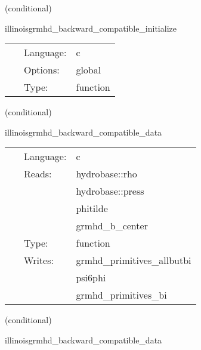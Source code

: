 \documentclass{article}
\begin{document}
\vspace{5mm}

   (conditional) 

\hspace{5mm} illinoisgrmhd\_backward\_compatible\_initialize 

\hspace{5mm}{\it set up the grhayl structs and read the table for tabulated eos. } 


\hspace{5mm}

 \begin{tabular*}{160mm}{cll} 
~ & Language:  & c \\ 
~ & Options:  & global \\ 
~ & Type:  & function \\ 
\end{tabular*} 


\vspace{5mm}

   (conditional) 

\hspace{5mm} illinoisgrmhd\_backward\_compatible\_data 

\hspace{5mm}{\it copy data to deprecated variables } 


\hspace{5mm}

 \begin{tabular*}{160mm}{cll} 
~ & Language:  & c \\ 
~ & Reads:  & hydrobase::rho \\ 
~& ~ &hydrobase::press\\ 
~& ~ &phitilde\\ 
~& ~ &grmhd\_b\_center\\ 
~ & Type:  & function \\ 
~ & Writes:  & grmhd\_primitives\_allbutbi \\ 
~& ~ &psi6phi\\ 
~& ~ &grmhd\_primitives\_bi\\ 
\end{tabular*} 


\vspace{5mm}

   (conditional) 

\hspace{5mm} illinoisgrmhd\_backward\_compatible\_data 

\hspace{5mm}{\it copy data to deprecated variables } 
\end{document}
